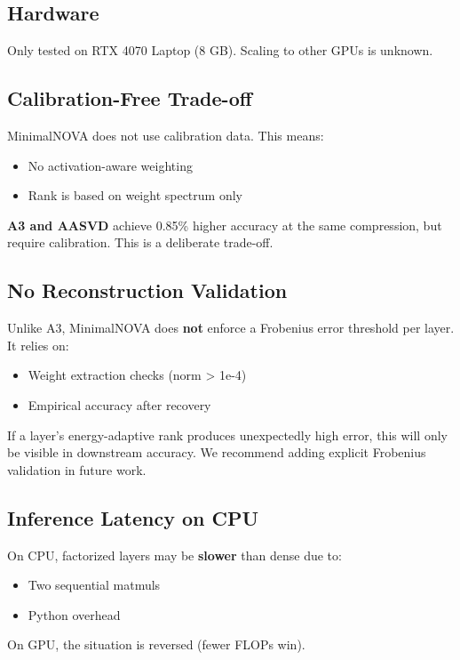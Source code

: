 \subsection{Hardware}

Only tested on RTX 4070 Laptop (8 GB). Scaling to other GPUs is unknown.

\subsection{Calibration-Free Trade-off}

MinimalNOVA does not use calibration data. This means:
\begin{itemize}
\item No activation-aware weighting
\item Rank is based on weight spectrum only

\end{itemize}
\textbf{A3 and AASVD} achieve 0.85\% higher accuracy at the same 
compression, but require calibration. This is a deliberate trade-off.

\subsection{No Reconstruction Validation}

Unlike A3, MinimalNOVA does \textbf{not} enforce a Frobenius error threshold 
per layer. It relies on:
\begin{itemize}
\item Weight extraction checks (norm \textgreater{} 1e-4)
\item Empirical accuracy after recovery

\end{itemize}
If a layer's energy-adaptive rank produces unexpectedly high error, this 
will only be visible in downstream accuracy. We recommend adding explicit 
Frobenius validation in future work.

\subsection{Inference Latency on CPU}

On CPU, factorized layers may be \textbf{slower} than dense due to:
\begin{itemize}
\item Two sequential matmuls
\item Python overhead

\end{itemize}
On GPU, the situation is reversed (fewer FLOPs win).

